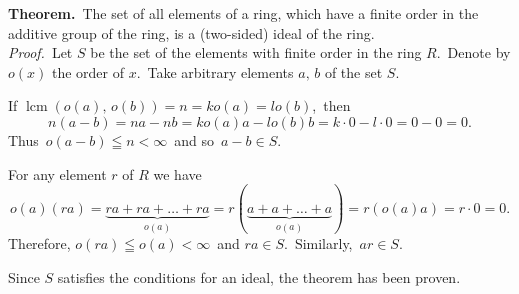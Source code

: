 \documentclass[12pt]{article}
\theoremstyle{definition}
\DeclareMathOperator{\lcm}{lcm}
\begin{document}
\textbf{Theorem.}\, The set of all elements of a ring, which have a finite order in the additive group of the ring, is a (two-sided) ideal of the ring.\\

{\em Proof.}\, Let $S$ be the set of the elements with finite order in the ring $R$.\, Denote by $o(x)$ the order of $x$.\, Take arbitrary elements $a,\,b$ of the set $S$.

If\; $\lcm(o(a),\,o(b)) = n = ko(a) = lo(b)$,\, then
$$n(a-b) = na-nb = ko(a)a-lo(b)b = k\cdot0-l\cdot0 = 0-0 = 0.$$
Thus\, $o(a-b) \leqq n < \infty$\, and so\, $a-b \in S$.

For any element $r$ of $R$ we have
$$o(a)(ra) = \underbrace{ra+ra+\ldots+ra}_{o(a)} = r(\underbrace{a+a+\ldots+a}_{o(a)}) =
r(o(a)a) = r\cdot0 = 0.$$
Therefore, $o(ra) \leqq o(a) < \infty$\, and $ra \in S$.\, Similarly,\, $ar \in S$.

Since $S$ satisfies the conditions for an ideal, the theorem has been proven.
\end{document}

